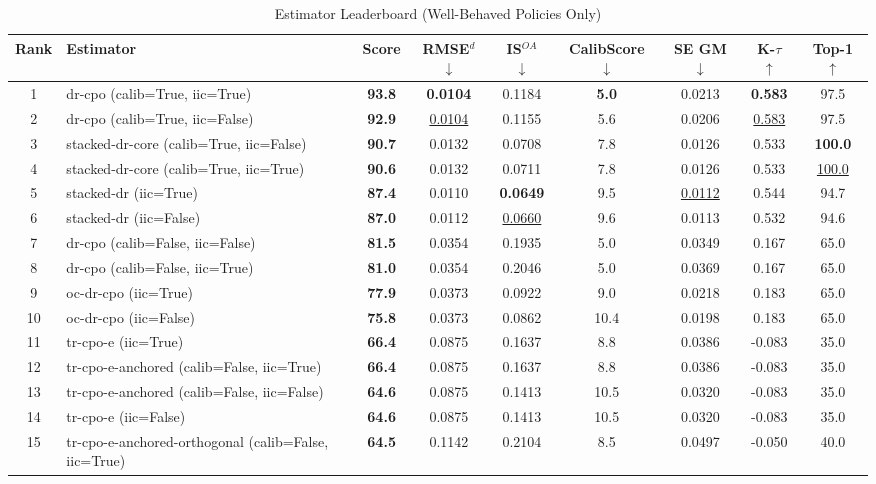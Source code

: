 \begin{table}[htbp]
\centering
\caption{Estimator Leaderboard (Well-Behaved Policies Only)}
\label{tab:leaderboard}
\begin{tabular}{cl|c|cccccc}
\toprule
Rank & Estimator & Score & RMSE$^d$ $\downarrow$ & IS$^{OA}$ $\downarrow$ & CalibScore $\downarrow$ & SE GM $\downarrow$ & K-$\tau$ $\uparrow$ & Top-1 $\uparrow$ \\
\midrule
1 & dr-cpo (calib=True, iic=True) & \textbf{93.8} & \textbf{0.0104} & 0.1184 & \textbf{5.0} & 0.0213 & \textbf{0.583} & 97.5 \\
2 & dr-cpo (calib=True, iic=False) & \textbf{92.9} & \underline{0.0104} & 0.1155 & 5.6 & 0.0206 & \underline{0.583} & 97.5 \\
3 & stacked-dr-core (calib=True, iic=False) & \textbf{90.7} & 0.0132 & 0.0708 & 7.8 & 0.0126 & 0.533 & \textbf{100.0} \\
4 & stacked-dr-core (calib=True, iic=True) & \textbf{90.6} & 0.0132 & 0.0711 & 7.8 & 0.0126 & 0.533 & \underline{100.0} \\
5 & stacked-dr (iic=True) & \textbf{87.4} & 0.0110 & \textbf{0.0649} & 9.5 & \underline{0.0112} & 0.544 & 94.7 \\
6 & stacked-dr (iic=False) & \textbf{87.0} & 0.0112 & \underline{0.0660} & 9.6 & 0.0113 & 0.532 & 94.6 \\
7 & dr-cpo (calib=False, iic=False) & \textbf{81.5} & 0.0354 & 0.1935 & 5.0 & 0.0349 & 0.167 & 65.0 \\
8 & dr-cpo (calib=False, iic=True) & \textbf{81.0} & 0.0354 & 0.2046 & 5.0 & 0.0369 & 0.167 & 65.0 \\
9 & oc-dr-cpo (iic=True) & \textbf{77.9} & 0.0373 & 0.0922 & 9.0 & 0.0218 & 0.183 & 65.0 \\
10 & oc-dr-cpo (iic=False) & \textbf{75.8} & 0.0373 & 0.0862 & 10.4 & 0.0198 & 0.183 & 65.0 \\
11 & tr-cpo-e (iic=True) & \textbf{66.4} & 0.0875 & 0.1637 & 8.8 & 0.0386 & -0.083 & 35.0 \\
12 & tr-cpo-e-anchored (calib=False, iic=True) & \textbf{66.4} & 0.0875 & 0.1637 & 8.8 & 0.0386 & -0.083 & 35.0 \\
13 & tr-cpo-e-anchored (calib=False, iic=False) & \textbf{64.6} & 0.0875 & 0.1413 & 10.5 & 0.0320 & -0.083 & 35.0 \\
14 & tr-cpo-e (iic=False) & \textbf{64.6} & 0.0875 & 0.1413 & 10.5 & 0.0320 & -0.083 & 35.0 \\
15 & tr-cpo-e-anchored-orthogonal (calib=False, iic=True) & \textbf{64.5} & 0.1142 & 0.2104 & 8.5 & 0.0497 & -0.050 & 40.0 \\

\end{tabular}
\end{table}
